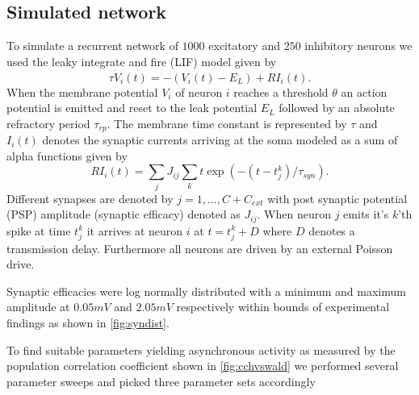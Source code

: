 \documentclass[11pt]{article}
\begin{document}
\subsection{Simulated network} 
To simulate a recurrent network of $ 1000 $ excitatory and $ 250 $ inhibitory neurons we used the leaky integrate and fire (LIF) model given by
\begin{equation}
	\tau \dot{V}_{i}(t) = -(V_{i}(t) - E_{L}) + RI_{i}(t).
    \label{eq:LIF}
\end{equation}
When the membrane potential $ V_{i} $ of neuron $ i $ reaches a threshold $ \theta $ an action potential is emitted and reset to the leak potential $ E_{L} $ followed by an absolute refractory period $ \tau_{rp} $. The membrane time constant is represented by $ \tau $ and $ I_{i}(t) $ denotes the synaptic currents arriving at the soma modeled as a sum of alpha functions given by
\begin{equation}
	\label{eq:syn}
	RI_{i}(t) = \sum_{j}J_{ij}\sum_{k}t\exp(-(t-t_{j}^{k})/\tau_{syn}).
\end{equation}
Different synapses are denoted by $ j = 1,...,C+C_{ext} $ with post synaptic potential (PSP) amplitude (synaptic efficacy) denoted as $ J_{ij} $. When neuron $ j $ emits it's $ k $'th spike at time $ t_{j}^k $ it arrives at neuron $ i $ at $ t = t_{j}^k + D $ where $ D $ denotes a transmission delay. Furthermore all neurons are driven by an external Poisson drive.

Synaptic efficacies were log normally distributed with a minimum and maximum amplitude at $ 0.05 mV $ and $ 2.05 mV $ respectively within bounds of experimental findings \cite{Sayer1990,Mason1991} as shown in \cref{fig:syndist}.

To find suitable parameters yielding asynchronous activity as measured by the population correlation coefficient shown in \cref{fig:cchvswald} we performed several parameter sweeps and picked three parameter sets accordingly
\end{document}

